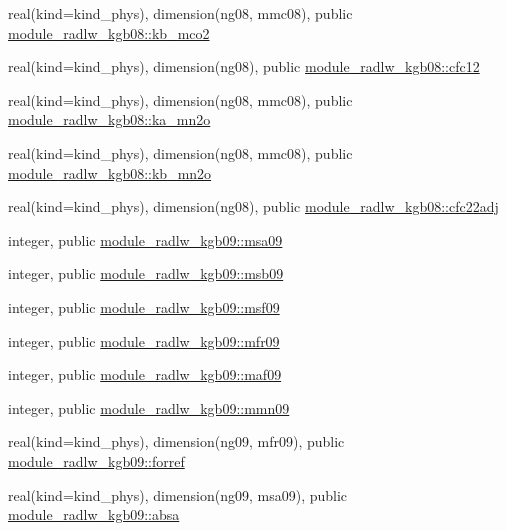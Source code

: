 \begin{DoxyCompactItemize}
\item 
real(kind=kind\+\_\+phys), dimension(ng08, mmc08), public \hyperlink{group__module__radlw__main_ga9a85770aee1b88b9323d9466c1772ec4}{module\+\_\+radlw\+\_\+kgb08\+::kb\+\_\+mco2}
\item 
real(kind=kind\+\_\+phys), dimension(ng08), public \hyperlink{group__module__radlw__main_ga010239f14788bc1ed9953133e30a62fd}{module\+\_\+radlw\+\_\+kgb08\+::cfc12}
\item 
real(kind=kind\+\_\+phys), dimension(ng08, mmc08), public \hyperlink{group__module__radlw__main_ga61949dc331e9a58d4f2a31b625481795}{module\+\_\+radlw\+\_\+kgb08\+::ka\+\_\+mn2o}
\item 
real(kind=kind\+\_\+phys), dimension(ng08, mmc08), public \hyperlink{group__module__radlw__main_ga9a8e2f789421acc307e37b03478efb4b}{module\+\_\+radlw\+\_\+kgb08\+::kb\+\_\+mn2o}
\item 
real(kind=kind\+\_\+phys), dimension(ng08), public \hyperlink{group__module__radlw__main_ga38a3ce7d8f3db6b732511cf78ef735db}{module\+\_\+radlw\+\_\+kgb08\+::cfc22adj}
\item 
integer, public \hyperlink{namespacemodule__radlw__kgb09_ab739f0acab23f3140067506b396b3717}{module\+\_\+radlw\+\_\+kgb09\+::msa09}
\item 
integer, public \hyperlink{group__module__radlw__main_ga7e6bb7acb0df29586d0bd52f3fc41d90}{module\+\_\+radlw\+\_\+kgb09\+::msb09}
\item 
integer, public \hyperlink{group__module__radlw__main_ga7d728ef04b3f26c6b20149084334be5a}{module\+\_\+radlw\+\_\+kgb09\+::msf09}
\item 
integer, public \hyperlink{group__module__radlw__main_ga777f63022c4f7187446945c6e6ba77e7}{module\+\_\+radlw\+\_\+kgb09\+::mfr09}
\item 
integer, public \hyperlink{group__module__radlw__main_ga7d5d565c87af7ef07dc17930f9cb9e57}{module\+\_\+radlw\+\_\+kgb09\+::maf09}
\item 
integer, public \hyperlink{group__module__radlw__main_gaa9c8294b56ac3ce90b07114e986777a9}{module\+\_\+radlw\+\_\+kgb09\+::mmn09}
\item 
real(kind=kind\+\_\+phys), dimension(ng09, mfr09), public \hyperlink{group__module__radlw__main_ga72a8c0879636dba20e2a8a35ba79f681}{module\+\_\+radlw\+\_\+kgb09\+::forref}
\item 
real(kind=kind\+\_\+phys), dimension(ng09, msa09), public \hyperlink{group__module__radlw__main_ga7a8726efe46fac4d6cce55ca357199ab}{module\+\_\+radlw\+\_\+kgb09\+::absa}
\item 

\end{DoxyCompactItemize}
